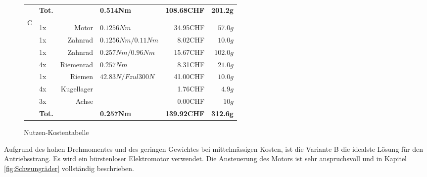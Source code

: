 \begin{figure}[h!]
\begin{tabular}{p{0.5cm}p{0.8cm}rp{3cm}rr}
          & \textbf{Tot.} &       & \textbf{0.514Nm} & \textbf{108.68CHF} & \textbf{201.2g} \\
    \multirow{9}[2]{*}{C} 
          &       &                 &                      &          &  \\
          &       &                 &                      &          &  \\
          & 1x    & Motor           & $0.1256 Nm$          & 34.95CHF & $57.0 g$ \\
          & 1x    & Zahnrad         & $0.1256 Nm / 0.11 Nm$& 8.02CHF  & $10.0 g$ \\
          & 1x    & Zahnrad         & $0.257 Nm / 0.96 Nm$ & 15.67CHF & $102.0 g$ \\
          & 4x    & Riemenrad       & $0.257 Nm$           & 8.31CHF  & $21.0 g$ \\
          & 1x    & Riemen          & $42.83 N /Fzul 300 N $ & 41.00CHF & $10.0 g$ \\
          & 4x    & Kugellager      &                      & 1.76CHF  & $4.9 g$ \\
          & 3x    & Achse           &                      & 0.00CHF  & $10 g$ \\
          & \textbf{Tot.} &       & \textbf{0.257Nm} & \textbf{139.92CHF} & \textbf{312.6g} \\
    \end{tabular}%
 	\centering
    \caption{Nutzen-Kostentabelle}
    \label{tab:addlabel}%
\end{figure}
Aufgrund des hohen Drehmomentes und des geringen Gewichtes bei mittelmässigen Kosten, ist die Variante B die idealste Lösung für den Antriebsstrang. Es wird ein bürstenloser Elektromotor verwendet. Die Ansteuerung des Motors ist sehr anspruchsvoll und in Kapitel \ref{fig:Schwungräder} vollständig beschrieben.

